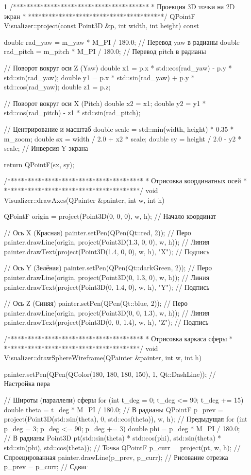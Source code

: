\begin{listing}{1}
/****************************************
* Проекция 3D точки на 2D экран         *
****************************************/
QPointF Visualizer::project(const Point3D &p, int width, int height) const {
  double rad_yaw = m_yaw * M_PI / 180.0; // Перевод yaw в радианы
  double rad_pitch = m_pitch * M_PI / 180.0; // Перевод pitch в радианы

  // Поворот вокруг оси Z (Yaw)
  double x1 = p.x * std::cos(rad_yaw) - p.y * std::sin(rad_yaw);
  double y1 = p.x * std::sin(rad_yaw) + p.y * std::cos(rad_yaw);
  double z1 = p.z;

  // Поворот вокруг оси X (Pitch)
  double x2 = x1;
  double y2 = y1 * std::cos(rad_pitch) - z1 * std::sin(rad_pitch);

  // Центрирование и масштаб
  double scale = std::min(width, height) * 0.35 * m_zoom;
  double sx = width / 2.0 + x2 * scale;
  double sy = height / 2.0 - y2 * scale; // Инверсия Y экрана

  return QPointF(sx, sy);
}

/****************************************
* Отрисовка координатных осей           *
****************************************/
void Visualizer::drawAxes(QPainter &painter, int w, int h) {
  QPointF origin = project(Point3D(0, 0, 0), w, h); // Начало координат

  // Ось X (Красная)
  painter.setPen(QPen(Qt::red, 2)); // Перо
  painter.drawLine(origin, project(Point3D(1.3, 0, 0), w, h)); // Линия
  painter.drawText(project(Point3D(1.4, 0, 0), w, h), "X"); // Подпись

  // Ось Y (Зелёная)
  painter.setPen(QPen(Qt::darkGreen, 2)); // Перо
  painter.drawLine(origin, project(Point3D(0, 1.3, 0), w, h)); // Линия
  painter.drawText(project(Point3D(0, 1.4, 0), w, h), "Y"); // Подпись

  // Ось Z (Синяя)
  painter.setPen(QPen(Qt::blue, 2)); // Перо
  painter.drawLine(origin, project(Point3D(0, 0, 1.3), w, h)); // Линия
  painter.drawText(project(Point3D(0, 0, 1.4), w, h), "Z"); // Подпись
}

/****************************************
* Отрисовка каркаса сферы               *
****************************************/
void Visualizer::drawSphereWireframe(QPainter &painter, int w, int h) {
  painter.setPen(QPen(QColor(180, 180, 180, 150), 1, Qt::DashLine)); // Настройка пера

  // Широты (параллели) сферы
  for (int t_deg = 0; t_deg <= 90; t_deg += 15) {
    double theta = t_deg * M_PI / 180.0; // В радианы
    QPointF p_prev = project(Point3D(std::sin(theta), 0, std::cos(theta)), w, h); // Предыдущая
    for (int p_deg = 3; p_deg <= 90; p_deg += 3) {
      double phi = p_deg * M_PI / 180.0; // В радианы
      Point3D pt(std::sin(theta) * std::cos(phi), std::sin(theta) * std::sin(phi), std::cos(theta)); // Точка
      QPointF p_curr = project(pt, w, h); // Спроецированная
      painter.drawLine(p_prev, p_curr); // Рисование отрезка
      p_prev = p_curr; // Сдвиг
    }
  }

}
\end{listing}
